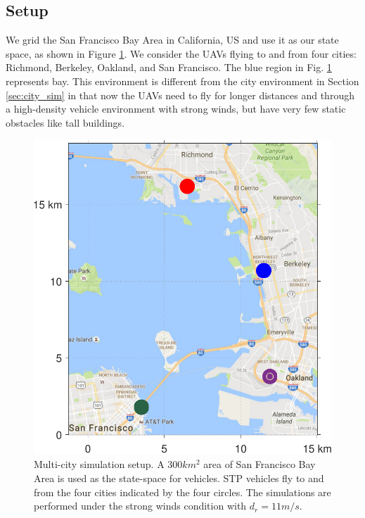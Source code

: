 \subsection{Setup \label{sec:bayArea_simSetup}}
We grid the San Francisco Bay Area in California, US and use it as our state space, as shown in Figure \ref{fig:bayArea_setup}. We consider the UAVs flying to and from four cities: Richmond, Berkeley, Oakland, and San Francisco. The blue region in Fig. \ref{fig:bayArea_setup} represents bay. This environment is different from the city environment in Section \ref{sec:city_sim} in that now the UAVs need to fly for longer distances and through a high-density vehicle environment with strong winds, but have very few static obstacles like tall buildings.    
%
\begin{figure}
  \centering
  \includegraphics[width=\columnwidth]{figs/bayArea_setup}
  \caption{Multi-city simulation setup. A $300 km^2$ area of San Francisco Bay Area is used as the state-space for vehicles. STP vehicles fly to and from the four cities indicated by the four circles. The simulations are performed under the strong winds condition with $d_{r} = 11 m/s$.}
  \label{fig:bayArea_setup}
\end{figure}

